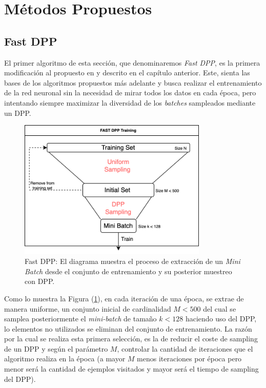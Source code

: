 \section{Métodos Propuestos}

\subsection{Fast DPP}

El primer algoritmo de esta sección, que denominaremos \textit{Fast DPP}, es la primera modificación al propuesto en \cite{https://doi.org/10.48550/arxiv.1804.02772} y descrito en el capítulo anterior. Este, sienta las bases de los algoritmos propuestos más adelante y busca realizar el entrenamiento de la red neuronal sin la necesidad de mirar todos los datos en cada época, pero intentando siempre maximizar la diversidad de los \textit{batches} sampleados mediante un DPP.

\begin{figure}[ht]
    \centering
    \includegraphics[width=9cm]{img/tesis/fast_dpp_diagram.png}
    \caption{Fast DPP: El diagrama muestra el proceso de extracción de un \textit{Mini Batch} desde el conjunto de entrenamiento y su posterior muestreo con DPP.}
    \label{fig:fast_dpp}
\end{figure}

Como lo muestra la Figura (\ref{fig:fast_dpp}), en cada iteración de una época, se extrae de manera uniforme, un conjunto inicial de cardinalidad $M < 500$ del cual se samplea posteriormente el \textit{mini-batch} de tamaño $k < 128$ haciendo uso del DPP, lo elementos no utilizados se eliminan del conjunto de entrenamiento. La razón por la cual se realiza esta primera selección, es la de reducir el coste de sampling de un DPP y según el parámetro $M$, controlar la cantidad de iteraciones que el algoritmo realiza en la época (a mayor $M$ menos iteraciones por época pero menor será la cantidad de ejemplos visitados y mayor será el tiempo de sampling del DPP).   

